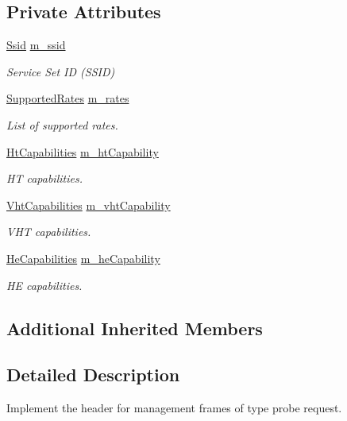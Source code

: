 \subsection*{Private Attributes}
\begin{DoxyCompactItemize}
\item 
\hyperlink{classns3_1_1Ssid}{Ssid} \hyperlink{classns3_1_1MgtProbeRequestHeader_a3bf06be379f216965c5534bb19d21fc1}{m\+\_\+ssid}
\begin{DoxyCompactList}\small\item\em Service Set ID (S\+S\+ID) \end{DoxyCompactList}\item 
\hyperlink{classns3_1_1SupportedRates}{Supported\+Rates} \hyperlink{classns3_1_1MgtProbeRequestHeader_a82d1da521d934e187f00b38867f244d3}{m\+\_\+rates}
\begin{DoxyCompactList}\small\item\em List of supported rates. \end{DoxyCompactList}\item 
\hyperlink{classns3_1_1HtCapabilities}{Ht\+Capabilities} \hyperlink{classns3_1_1MgtProbeRequestHeader_a90020bd13c4ddb5b4bb94b734e523cef}{m\+\_\+ht\+Capability}
\begin{DoxyCompactList}\small\item\em HT capabilities. \end{DoxyCompactList}\item 
\hyperlink{classns3_1_1VhtCapabilities}{Vht\+Capabilities} \hyperlink{classns3_1_1MgtProbeRequestHeader_acfd190373f8c431aa709e18d44fb368f}{m\+\_\+vht\+Capability}
\begin{DoxyCompactList}\small\item\em V\+HT capabilities. \end{DoxyCompactList}\item 
\hyperlink{classns3_1_1HeCapabilities}{He\+Capabilities} \hyperlink{classns3_1_1MgtProbeRequestHeader_a4b65c6f1e5d8da451bd4e84f2ddda08d}{m\+\_\+he\+Capability}
\begin{DoxyCompactList}\small\item\em HE capabilities. \end{DoxyCompactList}\end{DoxyCompactItemize}
\subsection*{Additional Inherited Members}


\subsection{Detailed Description}
Implement the header for management frames of type probe request. 


